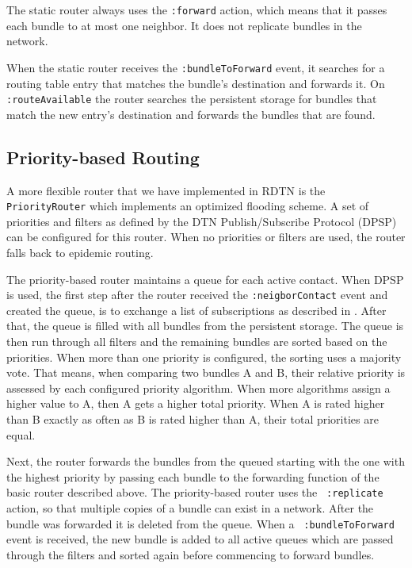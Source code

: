 \documentclass{article}
\begin{document}
The static router always uses the {\tt :forward} action, which means that it
passes each bundle to at most one neighbor. It does not replicate bundles in the
network.

When the static router receives the {\tt :bundleToForward} event, it searches
for a routing table entry that matches the bundle's destination and forwards it.
On {\tt :routeAvailable} the router searches the persistent storage for bundles
that match the new entry's destination and forwards the bundles that are found.

\subsection{Priority-based Routing}\label{sec.prio-routing}

A more flexible router that we have implemented in RDTN is the {\tt
PriorityRouter} which implements an optimized flooding scheme. A set of
priorities and filters as defined by the DTN Publish/Subscribe Protocol (DPSP)
can be configured for this router. When no priorities or filters are used, the
router falls back to epidemic routing.

The priority-based router maintains a queue for each active contact. When DPSP
is used, the first step after the router received the {\tt :neigborContact}
event and created the queue, is to exchange a list of subscriptions as described
in \cite{dtn-pubsub}. After that, the queue is filled with all bundles from the
persistent storage. The queue is then run through all filters and the remaining
bundles are sorted based on the priorities. When more than one priority is
configured, the sorting uses a majority vote. That means, when comparing two
bundles A and B, their relative priority is assessed by each configured priority
algorithm. When more algorithms assign a higher value to A, then A gets a higher
total priority. When A is rated higher than B exactly as often as B is rated
higher than A, their total priorities are equal.

Next, the router forwards the bundles from the queued starting with the one with
the highest priority by passing each bundle to the forwarding function of the
basic router described above. The priority-based router uses the {\tt
:replicate} action, so that multiple copies of a bundle can exist in a network.
After the bundle was forwarded it is deleted from the queue. When a {\tt
:bundleToForward} event is received, the new bundle is added to all active
queues which are passed through the filters and sorted again before commencing
to forward bundles.
\end{document}
